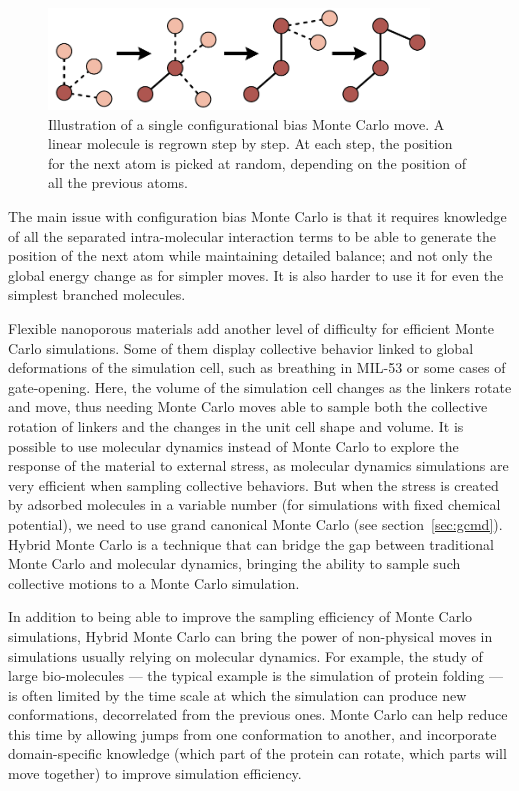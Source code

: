 \documentclass[thesis]{subfiles}
\begin{document}
\begin{figure}[ht]
    \centering
    \includegraphics[width=0.9\textwidth]{figures/images/cbmc}
    \caption{Illustration of a single configurational bias Monte Carlo move. A
    linear molecule is regrown step by step. At each step, the position for the
    next atom is picked at random, depending on the position of all the
    previous atoms.}
    \label{fig:cbmc}
\end{figure}

The main issue with configuration bias Monte Carlo is that it requires
knowledge of all the separated intra-molecular interaction terms to be able to
generate the position of the next atom while maintaining detailed balance; and
not only the global energy change as for simpler moves. It is also harder to use
it for even the simplest branched molecules.

Flexible nanoporous materials add another level of difficulty for efficient
Monte Carlo simulations. Some of them display collective behavior linked to
global deformations of the simulation cell, such as breathing in MIL-53 or some
cases of gate-opening. Here, the volume of the simulation cell changes as the
linkers rotate and move, thus needing Monte Carlo moves able to sample both the
collective rotation of linkers and the changes in the unit cell shape and
volume. It is possible to use molecular dynamics instead of Monte Carlo to
explore the response of the material to external stress, as molecular
dynamics simulations are very efficient when sampling collective behaviors. But
when the stress is created by adsorbed molecules in a variable number (for
simulations with fixed chemical potential), we need to use grand canonical Monte
Carlo (see section~\ref{sec:gcmd}). Hybrid Monte Carlo is a technique that can
bridge the gap between traditional Monte Carlo and molecular dynamics, bringing
the ability to sample such collective motions to a Monte Carlo
simulation\cite{Rogge2019}.

In addition to being able to improve the sampling efficiency of Monte Carlo
simulations, Hybrid Monte Carlo can bring the power of non-physical moves in
simulations usually relying on molecular dynamics. For example, the study of
large bio-molecules --- the typical example is the simulation of protein folding
--- is often limited by the time scale at which the simulation can produce new
conformations, decorrelated from the previous ones\cite{Izaguirre2004}. Monte
Carlo can help reduce this time by allowing jumps from one conformation to
another, and incorporate domain-specific knowledge (which part of the protein
can rotate, which parts will move together) to improve simulation efficiency.
\end{document}
